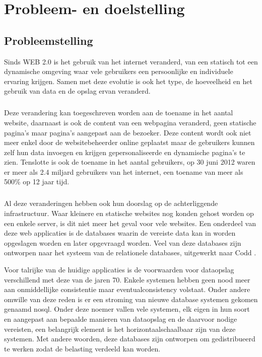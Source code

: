 \chapter{Probleem- en doelstelling}

\section{Probleemstelling}
Sinds WEB 2.0 is het gebruik van het internet veranderd, van een statisch tot een dynamische omgeving waar vele gebruikers een persoonlijke en individuele ervaring krijgen. Samen met deze evolutie is ook het type, de hoeveelheid en het gebruik van data en de opslag ervan veranderd. 

\paragraph{}
Deze verandering kan toegeschreven worden aan de toename in het aantal website, daarnaast is ook de content van een webpagina veranderd, geen statische pagina's maar pagina's aangepast aan de bezoeker. Deze content wordt ook niet meer enkel door de websitebeheerder online geplaatst maar de gebruikers kunnen zelf hun data invoegen en krijgen gepersonaliseerde en dynamische pagina's te zien. 
Tenslotte is ook de toename in het aantal gebruikers, op 30 juni 2012 waren er meer als 2.4 miljard gebruikers van het internet, een toename van meer als 500\% op 12 jaar tijd.  
\cite{WorldInternetStatics}

\paragraph{}
Al deze veranderingen hebben ook hun doorslag op de achterliggende infrastructuur. Waar kleinere en statische websites nog konden gehost worden op een enkele server, is dit niet meer het geval voor vele websites. 
Een onderdeel van deze web applicaties is de databases waarin de vereiste data kan in worden opgeslagen worden en later opgevraagd worden. Veel van deze databases zijn ontworpen naar het systeem van de relationele databases, uitgewerkt naar Codd \cite{Codd:1970:RMD:362384.362685}.

Voor talrijke van de huidige applicaties is de voorwaarden voor dataopslag verschillend met deze van de jaren 70. Enkele systemen hebben geen nood meer aan onmiddellijke consistentie maar \gls{eventualconsistency} volstaat. Onder andere omwille van deze reden is er een stroming van nieuwe database systemen gekomen genaamd \gls{nosql}. Onder deze noemer vallen vele systemen, elk eigen in hun soort en aangepast aan bepaalde manieren van dataopslag en de daarvoor nodige vereisten, een belangrijk element is het \gls{horizontaalschaalbaar} zijn van deze systemen. Met andere woorden, deze databases zijn ontworpen om gedistribueerd te werken zodat de belasting verdeeld kan worden. 

